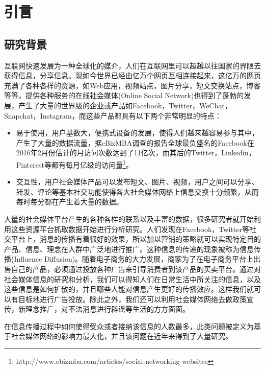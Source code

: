 

\chapter{引言}
\label{cha:firstChap01}
\section{研究背景}
互联网快速发展为一种全球化的媒介，人们在互联网里可以超越以往国家的界限去获得信息，分享信息。现如今世界已经由亿万个网页互相连接起来，这亿万的网页充满了各种各样的资源，如Web应用，视频站点，图片分享，短文交换站点，博客等等。提供各种服务的在线社会媒体(Online Social Network)也得到了蓬勃的发展，产生了大量的世界级的企业或产品如Facebook，Twitter，WeChat，Snapchat，Instagram，而这些产品都具有以下两个非常明显的特点：
\begin{itemize}
\item 易于使用，用户基数大，便携式设备的发展，使得人们越来越容易参与其中，产生了大量的数据流量，据eBizMBA调查的报告全球最负盛名的Facebook在2016年2月份估计的月访问次数达到了11亿次，而其后的Twitter，Linkedin，Pinterest等都有每月亿级的访问量\footnote{http://www.ebizmba.com/articles/social-networking-websites}。
\item 交互性，用户社会媒体产品可以发布短文、图片、视频，用户之间可以分享、转发、评论等基本社交功能使得各大社会媒体网络上信息交换十分频繁，从而每时每分都在产生着大量的数据。
\end{itemize}


大量的社会媒体平台产生的各种各样的联系以及丰富的数据，很多研究者就开始利用这些资源平台抓取数据开始进行分析研究。人们发现在Facebook，Twitter等社交平台上，消息的传播有着很好的效果，所以加以营销的策略就可以实现特定目的产品、信息、理念在人群中广泛地进行推广\cite{he2012influence}。这种信息的传递的现象被称为信息传播(Influence Diffusion)。随着电子商务的大力发展，商家为了在电子商务平台上出售自己的产品，必须通过投放各种广告来引导消费者到该产品的买卖平台。通过对社会媒体信息的研究和分析，我们可以得知人们在日常生活中所关注的信息，以及这些信息是如何扩散的，并且哪些人能对信息产生更好的传播效应。这样我们就可以有目标地进行广告投放。除此之外，我们还可以利用社会媒体网络去做政策宣传，新理念推广，对不法消息进行辟谣等生活的方方面面。


在信息传播过程中如何使得受众或者接纳该信息的人数最多，此类问题被定义为基于社会媒体网络的影响力最大化，并且该问题在近年来得到了大量研究\cite{he2012influence}\cite{kempe2003maximizing}\cite{chen2011influence}\cite{chen2010scalableKDD}。



